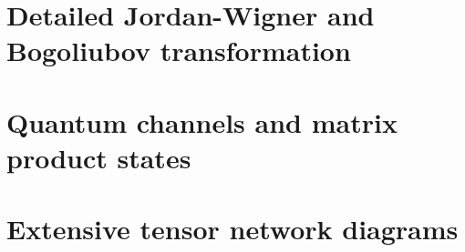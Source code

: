 \documentclass[12pt,a4paper]{book}
\begin{document}
\appendix

\chapter{Detailed Jordan-Wigner and Bogoliubov transformation} \label{ch:detailed_tfi_solution}


\chapter{Quantum channels and matrix product states} \label{ch:quantum_channels_mps}


\chapter{Extensive tensor network diagrams}
\label{ch:extensive_tensor_network_diagrams}


\backmatter


\end{document}
